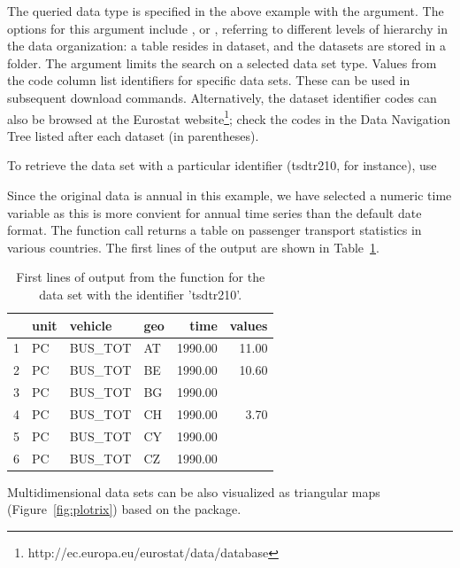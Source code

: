 The queried data type is specified in the above example with
the  argument. The options for this argument
include ,  or , referring to
different levels of hierarchy in the data organization: a table
resides in dataset, and the datasets are stored in a
folder. The  argument limits the search on a selected data
set type. Values from the code column list identifiers for specific
data sets. These can be used in subsequent download
commands. Alternatively, the dataset identifier codes can also be
browsed at the Eurostat
website\footnote{http://ec.europa.eu/eurostat/data/database}; check
the codes in the Data Navigation Tree listed after each dataset (in
parentheses).

To retrieve the data set with a particular identifier (tsdtr210, for
instance), use


Since the original data is annual in this example, we have selected a
numeric time variable as this is more convient for annual time series
than the default date format. The function call returns a table on
passenger transport statistics in various countries. The first lines
of the output are shown in Table~\ref{tab:getdatatable}.

\begin{table}[ht]
\centering
\begin{tabular}{rlllrr}
\toprule
  \hline
 & unit & vehicle & geo & time & values \\ 
  \hline
  1 & PC & BUS\_TOT & AT & 1990.00 & 11.00 \\ 
  2 & PC & BUS\_TOT & BE & 1990.00 & 10.60 \\ 
  3 & PC & BUS\_TOT & BG & 1990.00 &  \\ 
  4 & PC & BUS\_TOT & CH & 1990.00 & 3.70 \\ 
  5 & PC & BUS\_TOT & CY & 1990.00 &  \\ 
  6 & PC & BUS\_TOT & CZ & 1990.00 &  \\ 
   \hline
\bottomrule   
\end{tabular}
\caption{First lines of output from the  function for the data set with the identifier 'tsdtr210'.}
\label{tab:getdatatable}
\end{table}

Multidimensional data sets can be also visualized as triangular maps
(Figure~\ref{fig:plotrix}) based on
the  \citep{plotrix} package.


